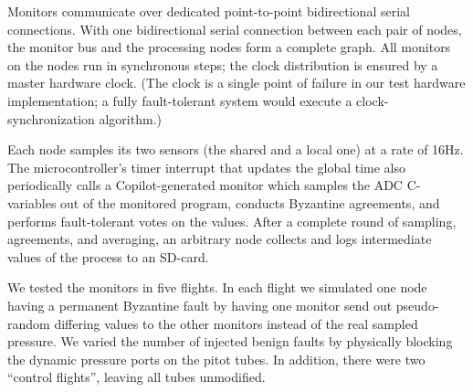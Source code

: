 

Monitors communicate over dedicated point-to-point bidirectional serial
connections.  With one bidirectional serial connection between each pair of
nodes, the monitor bus and the processing nodes form a complete graph.  All
monitors on the nodes run in synchronous steps; the clock distribution is
ensured by a master hardware clock.  (The clock is a single point of
failure in our test hardware implementation; a fully fault-tolerant
system would execute a clock-synchronization algorithm.)

Each node samples its two sensors (the shared and a local one) at a rate of 16Hz.
The microcontroller's timer interrupt that updates the global time also periodically calls
a Copilot-generated monitor which samples the ADC C-variables out of the monitored program,
conducts Byzantine agreements, and performs fault-tolerant votes on the values. After 
a complete round of sampling, agreements, and averaging, an arbitrary node collects and
logs intermediate values of the process to an SD-card.


We tested the monitors in five flights. In each flight we simulated one node
having a permanent Byzantine fault by having one monitor send out pseudo-random
differing values to the other monitors instead of the real sampled pressure.  We
varied the number of injected benign faults by physically blocking the dynamic
pressure ports on the pitot tubes. In addition, there were two ``control
flights'', leaving all tubes unmodified.


